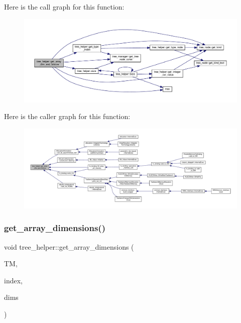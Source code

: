 Here is the call graph for this function\+:
\nopagebreak
\begin{figure}[H]
\begin{center}
\leavevmode
\includegraphics[width=350pt]{d7/d99/classtree__helper_a6e4f71d1a6990fa830f5a6c2d2d69513_cgraph}
\end{center}
\end{figure}
Here is the caller graph for this function\+:
\nopagebreak
\begin{figure}[H]
\begin{center}
\leavevmode
\includegraphics[width=350pt]{d7/d99/classtree__helper_a6e4f71d1a6990fa830f5a6c2d2d69513_icgraph}
\end{center}
\end{figure}
\mbox{\label{classtree__helper_af8f0e7df9b2a26a0610eeb6b4f7d23e2}} 
\subsubsection{\texorpdfstring{get\+\_\+array\+\_\+dimensions()}{get\_array\_dimensions()}}
{\footnotesize\ttfamily void tree\+\_\+helper\+::get\+\_\+array\+\_\+dimensions (\begin{DoxyParamCaption}\item[{const \hyperlink{tree__manager_8hpp_a792e3f1f892d7d997a8d8a4a12e39346}{tree\+\_\+manager\+Const\+Ref} \&}]{TM,  }\item[{const unsigned int}]{index,  }\item[{std\+::vector$<$ unsigned int $>$ \&}]{dims }\end{DoxyParamCaption})\hspace{0.3cm}{\ttfamily [static]}}



